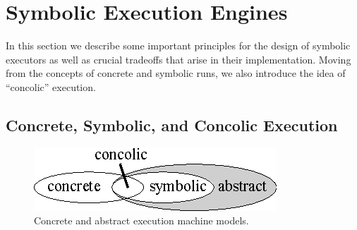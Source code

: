 
\section{Symbolic Execution Engines}
\label{se:executors}

In this section we describe some important principles for the design of symbolic executors as well as crucial tradeoffs that arise in their implementation. Moving from the concepts of concrete and symbolic runs, we also introduce the idea of ``concolic'' execution.

\subsection{Concrete, Symbolic, and Concolic Execution}
\label{ss:concrete-concolic-symbolic}
\label{ss:dynamic-symbolic-execution}

\begin{figure}[t]
\centering
\includegraphics[width=0.35\columnwidth]{images/concrete-abstract.eps} 
\caption{Concrete and abstract execution machine models.}
\label{fig:concrete-symbolic}
\end{figure}

